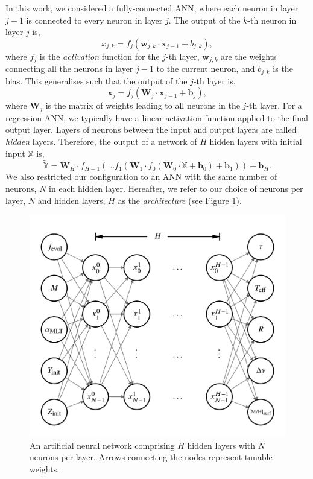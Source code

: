 \documentclass[a4paper,fleqn,usenatbib]{mnras}
\begin{document}
In this work, we considered a fully-connected ANN, where each neuron in layer $j-1$ is connected to every neuron in layer $j$. The output of the $k$-th neuron in layer $j$ is, 
%
\begin{equation}
    x_{j, k}=f_j(\boldsymbol{w}_{j, k} \cdot \boldsymbol{x}_{j-1} + b_{j, k}),
\end{equation}
%
where $f_j$ is the \emph{activation} function for the $j$-th layer, $\boldsymbol{w}_{j, k}$ are the weights connecting all the neurons in layer $j-1$ to the current neuron, and $b_{j, k}$ is the bias. This generalises such that the output of the $j$-th layer is,
%
\begin{equation}
    \boldsymbol{x}_{j}=f_j(\boldsymbol{W}_{j} \cdot \boldsymbol{x}_{j-1} + \boldsymbol{b}_{j}),
\end{equation}
%
where $\boldsymbol{W}_j$ is the matrix of weights leading to all neurons in the $j$-th layer. For a regression ANN, we typically have a linear activation function applied to the final output layer. Layers of neurons between the input and output layers are called \emph{hidden} layers. Therefore, the output of a network of $H$ hidden layers with initial input $\boldsymbol{\mathbb{X}}$ is,
%
\begin{equation}
    \widetilde{\boldsymbol{\mathbb{Y}}} = \boldsymbol{W}_{H} \cdot f_{H-1}(\dots f_1(\boldsymbol{W}_1 \cdot f_0(\boldsymbol{W}_{0} \cdot \boldsymbol{\mathbb{X}} + \boldsymbol{b}_{0}) + \boldsymbol{b}_1) ) + \boldsymbol{b}_{H}.
\end{equation}
%
We also restricted our configuration to an ANN with the same number of neurons, $N$ in each hidden layer. Hereafter, we refer to our choice of neurons per layer, $N$ and hidden layers, $H$ as the \emph{architecture} (see Figure \ref{fig:net}).

\begin{figure}
    \includegraphics[width=\linewidth]{figures/network_10.png}
    \caption{An artificial neural network comprising $H$ hidden layers with $N$ neurons per layer. Arrows connecting the nodes represent tunable weights.}
    \label{fig:net}
\end{figure}
\end{document}
